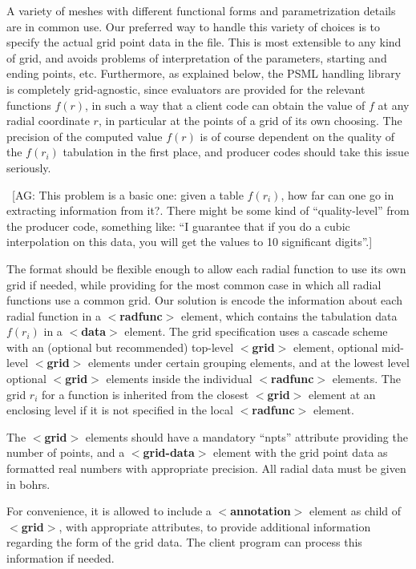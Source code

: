 \documentclass[prb,showpacs,superscriptaddress]{revtex4-1}
\def\tag#1{\textbf{$<$#1$>$}}
\newcommand{\AG}[1]{{\color{red}~\textsf{[AG: #1]}}}
\begin{document}
A variety of meshes with different functional forms and
parametrization details are in common use.  Our preferred way to
handle this variety of choices is to specify the actual grid point
data in the file. This is most extensible to any kind of grid, and
avoids problems of interpretation of the parameters, starting and
ending points, etc. Furthermore, as explained below, the PSML handling
library is completely grid-agnostic, since evaluators are provided for
the relevant functions $f(r)$, in such a way that a client code can
obtain the value of $f$ at any radial coordinate $r$, in particular at
the points of a grid of its own choosing. The precision of the
computed value $f(r)$ is of course dependent on the quality of the
$f(r_i)$ tabulation in the first place, and producer codes should take
this issue seriously.

\AG{This problem is a basic one: given a table $f(r_i)$, how far can
  one go in extracting information from it?. There might be some kind
  of ``quality-level'' from the producer code, something like: ``I
  guarantee that if you do a cubic interpolation on this data, you
  will get the values to 10 significant digits''.}
%

The format should be flexible enough to allow each radial function to
use its own grid if needed, while providing for the most common case
in which all radial functions use a common grid.  Our solution is
encode the information about each radial function in a \tag{radfunc}
element, which contains the tabulation data $f(r_i)$ in a \tag{data}
element. The grid specification uses a cascade scheme with an
(optional but recommended) top-level \tag{grid} element, optional
mid-level \tag{grid} elements under certain grouping elements, and at
the lowest level optional \tag{grid} elements inside the individual
\tag{radfunc} elements.  The grid $r_i$ for a function is inherited
from the closest \tag{grid} element at an enclosing level if it is not
specified in the local \tag{radfunc} element.

The \tag{grid} elements should have a mandatory ``npts'' attribute
providing the number of points, and a \tag{grid-data} element with the
grid point data as formatted real numbers with appropriate
precision. All radial data must be given in bohrs.

For convenience, it is allowed to include a \tag{annotation} element
as child of \tag{grid}, with appropriate attributes, to provide
additional information regarding the form of the grid data. The client
program can process this information if needed.
%
\end{document}
